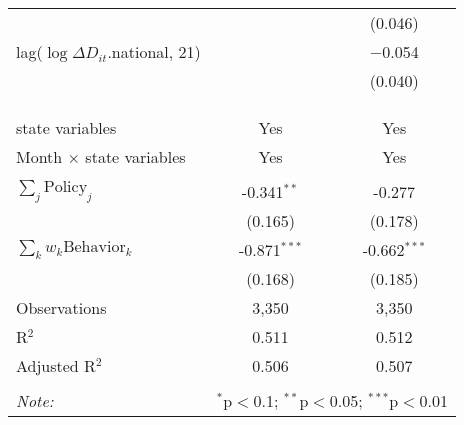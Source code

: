 \begin{tabular}{@{\extracolsep{1pt}}lcc}
  &  & (0.046) \\ 
  lag($\log \Delta D_{it}$.national, 21) &  & $-$0.054 \\ 
  &  & (0.040) \\ 
   &  &  \\ 
  &  &  \\ 
 \hline \\[-1.8ex] 
state variables & Yes & Yes \\ 
Month $\times$ state variables & Yes & Yes \\ 
\hline \\[-1.8ex] 
$\sum_j \mathrm{Policy}_j$ & -0.341$^{**}$ & -0.277 \\ 
 & (0.165) & (0.178) \\ 
$\sum_k w_k \mathrm{Behavior}_k$ & -0.871$^{***}$ & -0.662$^{***}$ \\ 
 & (0.168) & (0.185) \\ 
Observations & 3,350 & 3,350 \\ 
R$^{2}$ & 0.511 & 0.512 \\ 
Adjusted R$^{2}$ & 0.506 & 0.507 \\ 
\hline 
\hline \\[-1.8ex] 
\textit{Note:}  & \multicolumn{2}{r}{$^{*}$p$<$0.1; $^{**}$p$<$0.05; $^{***}$p$<$0.01} \\ 
\end{tabular} 